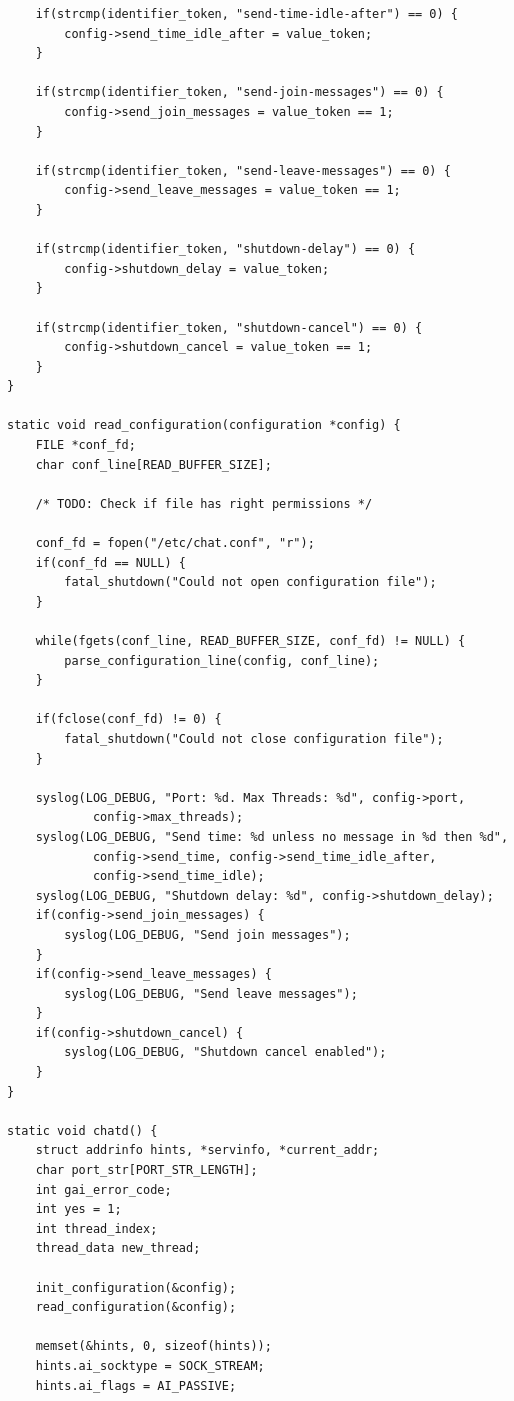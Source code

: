 \documentclass{article}
\begin{document}
\begin{verbatim}
    if(strcmp(identifier_token, "send-time-idle-after") == 0) {
        config->send_time_idle_after = value_token;
    }
    
    if(strcmp(identifier_token, "send-join-messages") == 0) {
        config->send_join_messages = value_token == 1;
    }
    
    if(strcmp(identifier_token, "send-leave-messages") == 0) {
        config->send_leave_messages = value_token == 1;
    }
    
    if(strcmp(identifier_token, "shutdown-delay") == 0) {
        config->shutdown_delay = value_token;
    }
    
    if(strcmp(identifier_token, "shutdown-cancel") == 0) {
        config->shutdown_cancel = value_token == 1;
    }
}

static void read_configuration(configuration *config) {
    FILE *conf_fd;
    char conf_line[READ_BUFFER_SIZE];
    
    /* TODO: Check if file has right permissions */
    
    conf_fd = fopen("/etc/chat.conf", "r");
    if(conf_fd == NULL) {
        fatal_shutdown("Could not open configuration file");
    }
    
    while(fgets(conf_line, READ_BUFFER_SIZE, conf_fd) != NULL) {
        parse_configuration_line(config, conf_line);
    }
    
    if(fclose(conf_fd) != 0) {
        fatal_shutdown("Could not close configuration file");
    }
    
    syslog(LOG_DEBUG, "Port: %d. Max Threads: %d", config->port,
            config->max_threads);
    syslog(LOG_DEBUG, "Send time: %d unless no message in %d then %d",
            config->send_time, config->send_time_idle_after,
            config->send_time_idle);
    syslog(LOG_DEBUG, "Shutdown delay: %d", config->shutdown_delay);
    if(config->send_join_messages) {
        syslog(LOG_DEBUG, "Send join messages");
    }
    if(config->send_leave_messages) {
        syslog(LOG_DEBUG, "Send leave messages");
    }
    if(config->shutdown_cancel) {
        syslog(LOG_DEBUG, "Shutdown cancel enabled");
    }
}

static void chatd() {
    struct addrinfo hints, *servinfo, *current_addr;
    char port_str[PORT_STR_LENGTH];
    int gai_error_code;
    int yes = 1;
    int thread_index;
    thread_data new_thread;
    
    init_configuration(&config);
    read_configuration(&config);
    
    memset(&hints, 0, sizeof(hints));
    hints.ai_socktype = SOCK_STREAM;
    hints.ai_flags = AI_PASSIVE;
    

\end{verbatim}
\end{document}
